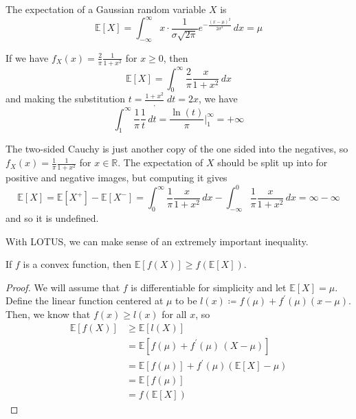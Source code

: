     \begin{example}
      The expectation of a Gaussian random variable $X$ is
      \begin{equation}
        \mathbb{E}[X] = \int_{-\infty}^\infty x \cdot \frac{1}{\sigma \sqrt{2\pi}} e^{-\frac{(x - \mu)^2}{2 \sigma^2}} \, dx = \mu
      \end{equation}
    \end{example}

    \begin{example}
      If we have $f_X (x) = \frac{2}{\pi} \frac{1}{1 + x^2}$ for $x \geq 0$, then 
      \begin{equation}
        \mathbb{E}[X] = \int_0^\infty \frac{2}{\pi} \frac{x}{1 + x^2} \,dx
      \end{equation}
      and making the substitution $t = \frac{1 + x^2}, \; dt = 2x$, we have 
      \begin{equation}
        \int_1^\infty \frac{1}{\pi} \frac{1}{t} \,dt = \frac{\ln(t)}{\pi} \bigg|_1^\infty = +\infty
      \end{equation}
    \end{example}

    \begin{example}
      The two-sided Cauchy is just another copy of the one sided into the negatives, so $f_X (x) = \frac{1}{\pi} \frac{1}{1 + x^2}$ for $x \in \mathbb{R}$. The expectation of $X$ should be split up into for positive and negative images, but computing it gives 
      \begin{equation}
        \mathbb{E}[X] = \mathbb{E}[X^+] - \mathbb{E}[X^-] = \int_0^\infty \frac{1}{\pi} \frac{x}{1 + x^2}\,dx - \int_{-\infty}^0 \frac{1}{\pi} \frac{x}{1 + x^2}\,dx = \infty - \infty
      \end{equation}
      and so it is undefined. 
    \end{example}

    With LOTUS, we can make sense of an extremely important inequality. 

    \begin{theorem}
      If $f$ is a convex function, then $\mathbb{E}[f(X)] \geq f (\mathbb{E}[X])$. 
    \end{theorem}
    \begin{proof}
      We will assume that $f$ is differentiable for simplicity and let $\mathbb{E}[X] = \mu$. Define the linear function centered at $\mu$ to be $l(x) \coloneqq f(\mu) + f^\prime (\mu) (x - \mu)$. Then, we know that $f(x) \geq l(x)$ for all $x$, so 
      \begin{align*}
        \mathbb{E}[f(X)] & \geq \mathbb{E}[ l(X)] \\ 
        & = \mathbb{E}[f(\mu) + f^\prime (\mu) \, (X - \mu)] \\
        & = \mathbb{E}[f(\mu)] + f^\prime (\mu) ( \mathbb{E}[X] - \mu) \\
        & = \mathbb{E}[f(\mu)] \\
        & = f(\mathbb{E}[X])
      \end{align*}
    \end{proof}

